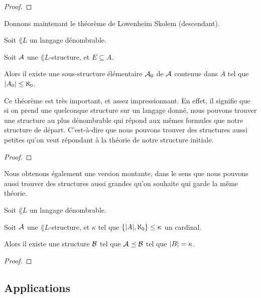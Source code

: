 \documentclass[a4paper, 12pt]{article}
\begin{document}
\begin{proof}

\end{proof}

Donnons maintenant le théorème de Lowenheim Skolem (descendant).

\begin{theorem} 
	Soit $\lang{L}$ un langage dénombrable.

	Soit $\mathcal{A}$ une $\lang{L}$-structure, et $E \subseteq A$.

	Alors il existe une sous-structure élémentaire $\mathcal{A}_{0}$ de
	$\mathcal{A}$ contenue dans $A$ tel que $|A_{0}| \leq
	\aleph_{0}$.
	\label{theorem:lowenheim_skolem_descendant}
\end{theorem}

Ce théorème est très important, et assez impressionnant. En effet, il signifie
que si on prend une quelconque structure sur un langage donné, nous pouvons
trouver une structure au plus dénombrable qui répond aux mêmes formules que
notre structure de départ. C'est-à-dire que nous pouvons trouver des structures
aussi petites qu'on veut répondant à la théorie de notre structure initiale.

\begin{proof}

\end{proof}

Nous obtenons également une version montante, dans le sens que nous pouvons
aussi trouver des structures aussi grandes qu'on souhaite qui garde la même théorie.

\begin{theorem} 
	Soit $\lang{L}$ un langage dénombrable.

	Soit $\mathcal{A}$ une $\lang{L}$-structure, et $\kappa$ tel que
	$\left\{ |A|, \aleph_{0} \right\} \leq \kappa$ un cardinal.

	Alors il existe une structure $\mathcal{B}$ tel que $\mathcal{A}
	\preceq \mathcal{B}$ tel que $|B| = \kappa$.
	\label{theorem:lowenheim_skolem_montant}
\end{theorem}

\begin{proof}

\end{proof}


\subsection{Applications}
\end{document}
